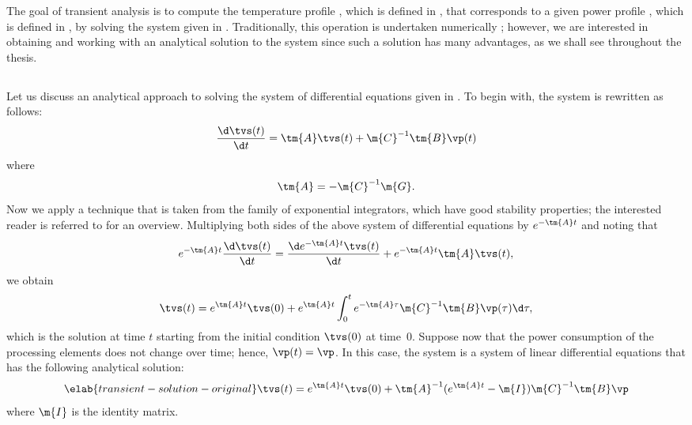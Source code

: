 The goal of transient analysis is to compute the temperature profile \mq, which
is defined in , that corresponds to a given power
profile \mp, which is defined in , by solving the system
given in . Traditionally, this operation is
undertaken numerically \cite{skadron2003}; however, we are interested in
obtaining and working with an analytical solution to the system since such a
solution has many advantages, as we shall see throughout the thesis.

\subsection{\pasttitle}

Let us discuss an analytical approach to solving the system of differential
equations given in . To begin with, the
system is rewritten as follows:
\[
  \frac{\d \tvs(t)}{\d t} = \tm{A} \tvs(t) + \m{C}^{-1} \tm{B} \vp(t)
\]
where
\[
  \tm{A} = -\m{C}^{-1} \m{G}.
\]
Now we apply a technique that is taken from the family of exponential
integrators, which have good stability properties; the interested reader is
referred to \cite{hochbruck2010} for an overview. Multiplying both sides of the
above system of differential equations by $e^{- \tm{A} t}$ and noting that
\[
  e^{-\tm{A} t} \frac{\d \tvs(t)}{\d t} = \frac{\d e^{-\tm{A} t} \tvs(t)}{\d t} + e^{-\tm{A} t} \tm{A} \tvs(t),
\]
we obtain
\[
  \tvs(t) = e^{\tm{A} t} \tvs(0) + e^{\tm{A} t} \int_0^t e^{-\tm{A} \tau} \m{C}^{-1} \tm{B} \vp(\tau) \d \tau,
\]
which is the solution at time $t$ starting from the initial condition $\tvs(0)$
at time~0. Suppose now that the power consumption of the processing elements
does not change over time; hence, $\vp(t) = \vp$. In this case, the system is a
system of linear differential equations that has the following analytical
solution:
\begin{equation} \elab{transient-solution-original}
  \tvs(t) = e^{\tm{A} t} \tvs(0) + \tm{A}^{-1} (e^{\tm{A} t} - \m{I}) \m{C}^{-1} \tm{B} \vp
\end{equation}
where $\m{I}$ is the identity matrix.

